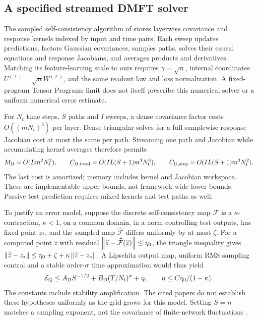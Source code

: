 \subsection{A specified streamed DMFT solver}
\label{app:comparison-dmft}

The sampled self-consistency algorithm of
\citet[Appendix~B, Algorithm~1]{bordelon2022dmft} stores layerwise covariance
and response kernels indexed by input and time pairs.  Each sweep updates
predictions, factors Gaussian covariances, samples paths, solves their causal
equations and response Jacobians, and averages products and derivatives.
Matching its feature-learning scale to ours requires $\gamma=\sqrt n$,
internal coordinates $U^{(\ell)}=\sqrt nW^{(\ell)}$, and the same readout
law and loss normalization.  A fixed-program Tensor Programs limit
\citep[Algorithm~1, Theorem~7.4]{yang2021tensor} does not itself prescribe
this numerical solver or a uniform numerical error estimate.

For $N_t$ time steps, $S$ paths and $I$ sweeps, a dense covariance factor costs
$O((mN_t)^3)$ per layer.  Dense triangular solves for a full samplewise
response Jacobian cost at most the same per path.  Streaming one path and
Jacobian while accumulating kernel averages therefore permits
\begin{equation}
 M_{\rm D}=O(Lm^2N_t^2),\qquad
 C_{\rm D,total}=O(IL(S+1)m^3N_t^3),\qquad
 C_{\rm D,step}=O(IL(S+1)m^3N_t^2).
 \label{cmp:dmft-cost}
\end{equation}
The last cost is amortized; memory includes kernel and Jacobian workspace.
These are implementable upper bounds, not framework-wide lower bounds.
Passive test prediction requires mixed kernels and test paths as well.

To justify an error model, suppose the discrete self-consistency map
$\mathcal F$ is a $\kappa$-contraction, $\kappa<1$, on a common domain,
in a norm controlling test outputs, has fixed point $z_*$, and the sampled map
$\widehat{\mathcal F}$ differs
uniformly by at most $\zeta$.  For a computed point $\widehat z$ with residual
$\left\lVert \widehat z-\widehat{\mathcal F}(\widehat z)\right\rVert\le\eta_0$, the triangle
inequality gives
$\left\lVert \widehat z-z_*\right\rVert\le\eta_0+\zeta+\kappa\left\lVert \widehat z-z_*\right\rVert$.
A Lipschitz output map, uniform RMS sampling control and a stable order-$\sigma$
time approximation would thus yield
\begin{equation}
 \mathcal E_Q\le A_{\rm D}S^{-1/2}+B_{\rm D}(T/N_t)^\sigma+\eta,
 \qquad \eta\le C\eta_0/(1-\kappa).
 \label{cmp:dmft-error}
\end{equation}
The constants include stability amplification.  The cited papers do not
establish these hypotheses uniformly as the grid grows for this model.
Setting $S=n$ matches a sampling exponent, not the covariance of finite-network
fluctuations \citep{bordelon2023finite}.

